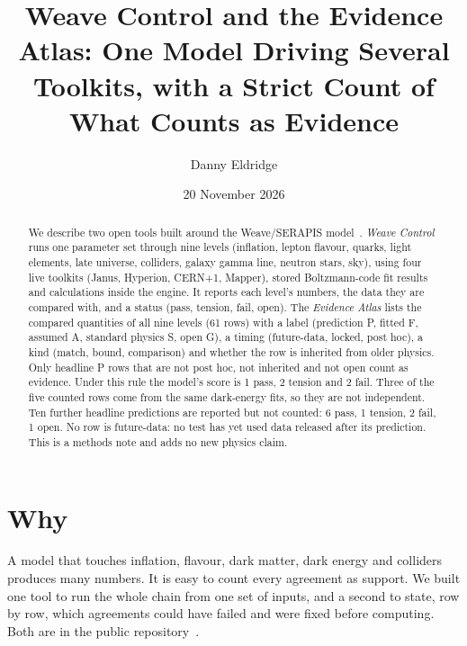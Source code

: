 \documentclass[aps,prd,twocolumn,superscriptaddress,nofootinbib,showkeys]{revtex4-2}
\begin{document}
\title{Weave Control and the Evidence Atlas: One Model Driving Several Toolkits, with a Strict Count of What Counts as Evidence}
\author{Danny Eldridge}
\date{20 November 2026}
\begin{abstract}
We describe two open tools built around the Weave/SERAPIS model~\cite{P1,P2,P3,P4}. \emph{Weave Control} runs one parameter set through nine levels (inflation, lepton flavour, quarks, light elements, late universe, colliders, galaxy gamma line, neutron stars, sky), using four live toolkits (Janus, Hyperion, CERN+1, Mapper), stored Boltzmann-code fit results and calculations inside the engine. It reports each level's numbers, the data they are compared with, and a status (pass, tension, fail, open). The \emph{Evidence Atlas} lists the compared quantities of all nine levels (61 rows) with a label (prediction P, fitted F, assumed A, standard physics S, open G), a timing (future-data, locked, post hoc), a kind (match, bound, comparison) and whether the row is inherited from older physics. Only headline P rows that are not post hoc, not inherited and not open count as evidence. Under this rule the model's score is 1 pass, 2 tension and 2 fail. Three of the five counted rows come from the same dark-energy fits, so they are not independent. Ten further headline predictions are reported but not counted: 6 pass, 1 tension, 2 fail, 1 open. No row is future-data: no test has yet used data released after its prediction. This is a methods note and adds no new physics claim.
\end{abstract}
\maketitle

\section{Why}
A model that touches inflation, flavour, dark matter, dark energy and colliders produces many numbers. It is easy to count every agreement as support. We built one tool to run the whole chain from one set of inputs, and a second to state, row by row, which agreements could have failed and were fixed before computing. Both are in the public repository~\cite{REPO}.
\end{document}
